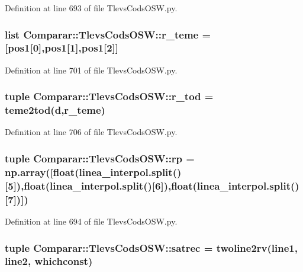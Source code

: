 \-Definition at line 693 of file \-Tlevs\-Cods\-O\-S\-W.\-py.

\subsubsection[{r\-\_\-teme}]{\setlength{\rightskip}{0pt plus 5cm}list {\bf \-Comparar\-::\-Tlevs\-Cods\-O\-S\-W\-::r\-\_\-teme} = [pos1[0],pos1[1],pos1[2]]}\label{namespace_comparar_1_1_tlevs_cods_o_s_w_a7e8d3edb1b36c374efcdafd0fb6c69c8}


\-Definition at line 701 of file \-Tlevs\-Cods\-O\-S\-W.\-py.

\subsubsection[{r\-\_\-tod}]{\setlength{\rightskip}{0pt plus 5cm}tuple {\bf \-Comparar\-::\-Tlevs\-Cods\-O\-S\-W\-::r\-\_\-tod} = teme2tod({\bf d},{\bf r\-\_\-teme})}\label{namespace_comparar_1_1_tlevs_cods_o_s_w_aa7d018c2a669560e6201c84adeb53ff3}


\-Definition at line 706 of file \-Tlevs\-Cods\-O\-S\-W.\-py.

\subsubsection[{rp}]{\setlength{\rightskip}{0pt plus 5cm}tuple {\bf \-Comparar\-::\-Tlevs\-Cods\-O\-S\-W\-::rp} = np.\-array([float(linea\-\_\-interpol.\-split()[5]),float(linea\-\_\-interpol.\-split()[6]),float(linea\-\_\-interpol.\-split()[7])])}\label{namespace_comparar_1_1_tlevs_cods_o_s_w_a5e389b559374b48e3d7eabf11bed2c9e}


\-Definition at line 694 of file \-Tlevs\-Cods\-O\-S\-W.\-py.

\subsubsection[{satrec}]{\setlength{\rightskip}{0pt plus 5cm}tuple {\bf \-Comparar\-::\-Tlevs\-Cods\-O\-S\-W\-::satrec} = twoline2rv({\bf line1}, {\bf line2}, {\bf whichconst})}\label{namespace_comparar_1_1_tlevs_cods_o_s_w_a0bfe4765874dd65107c89bf8aea32540}


